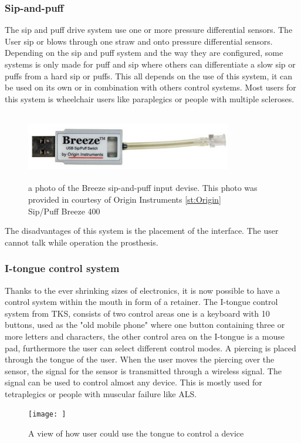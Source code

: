 \subsubsection*{Sip-and-puff}
The sip and puff drive system use one or more pressure differential sensors. The User sip or blows through one straw and onto pressure differential sensors. Depending on the sip and puff system and the way they are configured, some systems is only made for puff and sip where others can differentiate a slow sip or puffs from a hard sip or puffs. This all depends on the use of this system, it can be used on its own or in combination with others control systems\cite{Snp}. Most users for this system is wheelchair users like paraplegics or people with multiple scleroses.\\
\begin{figure}[H]
    \centering
    \includegraphics[width=9cm,height=3cm]{Figures/Contextual_figures/breeze_400.jpg}
    \caption{a photo of the Breeze sip-and-puff input devise. This photo was provided in courtesy of Origin Instruments \ref{st:Origin}\\ 
    Sip/Puff Breeze 400\cite{Snp}}
    \label{fig:Sip/Puff}
\end{figure}
The disadvantages of this system is the placement of the interface. The user cannot talk while operation the prosthesis. 
\subsubsection*{I-tongue control system}
Thanks to the ever shrinking sizes of electronics, it is now possible to have a control system within the mouth in form of a retainer. The I-tongue control system from TKS\cite{TKS}, consists of two control areas one is a keyboard with 10 buttons, used as the "old mobile phone" where one button containing three or more letters and characters, the other control area on the I-tongue is a mouse pad, furthermore the user can select different control modes. A piercing is placed through the tongue of the user. When the user moves the piercing over the sensor, the signal for the sensor is transmitted through a wireless signal. The signal can be used to control almost any device. This is mostly used for tetraplegics or people with muscular failure like ALS\cite{TDSp}.\\
\begin{figure}[H]
    \centering
    \texttt{[image: ]}
    \caption{A view of how user could use the tongue to control a device\cite{TDSp}}
    \label{fig:TDS}
\end{figure}
 
